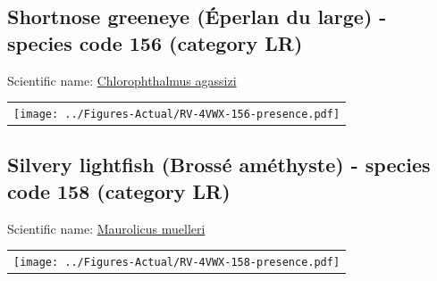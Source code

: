 \documentclass[12pt]{article}\usepackage[]{graphicx}\usepackage[]{color}
\begin{document}
\setcounter{figure}{0}

\hypertarget{sec:156}{%
\subsection{Shortnose greeneye (Éperlan du large) - species code 156 (category LR)}\label{sec:156}}

  


Scientific name: \href{http://www.marinespecies.org/aphia.php?p=taxdetails\&id=126336}{Chlorophthalmus agassizi} \newline
\begin{minipage}{1.0\textwidth}
 \begin{tabular}{c}
\texttt{[image: ../Figures-Actual/RV-4VWX-156-presence.pdf]} \\ 
\end{tabular} 
\end{minipage}
\clearpage

\renewcommand\thefigure{\thesubsection\Alph{figure}}

\setcounter{figure}{0}

\hypertarget{sec:158}{%
\subsection{Silvery lightfish (Brossé améthyste) - species code 158 (category LR)}\label{sec:158}}

  


Scientific name: \href{http://www.marinespecies.org/aphia.php?p=taxdetails\&id=127312}{Maurolicus muelleri} \newline
\begin{minipage}{1.0\textwidth}
 \begin{tabular}{c}
\texttt{[image: ../Figures-Actual/RV-4VWX-158-presence.pdf]} \\ 
\end{tabular} 
\end{minipage}
\clearpage

\renewcommand\thefigure{\thesubsection\Alph{figure}}
\end{document}
